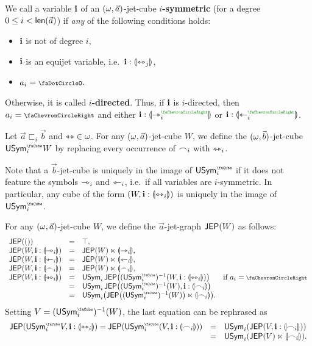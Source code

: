 \documentclass[a4paper]{memoir}
\begin{document}
\begin{definition} \label{def:symmetric-var}
	We call a variable $\mathbf{i}$ of an $(\omega, \vec a)$-jet-cube \textbf{$i$-symmetric} (for a degree $0 \leq i < \mathsf{len}(\vec a)$) if \emph{any} of the following conditions holds:
	\begin{itemize}
		\item $\mathbf{i}$ is not of degree $i$,
		\item $\mathbf{i}$ is an equijet variable, i.e.\ $\mathbf{i} : {\llparenthesis \leftrightarrowtriangle_j \rrparenthesis}$,
		\item $a_i = \npolar$.
	\end{itemize}
	Otherwise, it is called \textbf{$i$-directed}.
	Thus, if $\mathbf{i}$ is $i$-directed, then $a_i = \ypolar$ and either $\dm i : \rival{\jet_i\pmr{\ypolar}}$ or $\dm i : \rival{\tej_i\pmr{\ypolar}}$.
\end{definition}
\begin{definition} \label{def:sym-forget-cube}
	Let $\vec a \sqsubset_i \vec b$ and ${\leftrightarrowtriangle} \in \omega$. For any $(\omega, \vec a)$-jet-cube $W$, we define the $(\omega, \vec b)$-jet-cube $\Usymcube_i W$ by replacing every occurrence of $\frown_i$ with $\leftrightarrowtriangle_i$.
\end{definition}
Note that a $\vec b$-jet-cube is uniquely in the image of $\Usymcube_i$ if it does not feature the symbols $\rightarrowtriangle_i$ and $\leftarrowtriangle_i$, i.e.\ if all variables are $i$-symmetric.
In particular, any cube of the form $(W, \mathbf{i} : {\llparenthesis \leftrightarrowtriangle_i \rrparenthesis})$ is uniquely in the image of $\Usymcube_i$.
\begin{definition} \label{def:jep}
	For any $(\omega, \vec a)$-jet-cube $W$, we define the $\vec a$-jet-graph $\mathsf{JEP}(W)$ as follows:
	\[ \begin{array}{l c l l}
		\JEP(()) &=& \top, \\
		\JEP(W, \dm i : \rival{\jet_i}) &=& \JEP(W) \multip \rival{\jet_i}, \\
		\JEP(W, \dm i : \rival{\tej_i}) &=& \JEP(W) \multip \rival{\tej_i}, \\
		\JEP(W, \dm i : \rival{\edge_i}) &=& \JEP(W) \multip \rival{\edge_i}, \\
		\JEP(W, \dm i : \rival{\equijet_i}) &=& \Usym_i \, \JEP\paren{(\Usymcube_i)\inv(W, \dm i : \rival{\equijet_i})}
		& \text{if $a_i = \ypolar$} \\
		&=& \Usym_i \, \JEP\paren{(\Usymcube_i)\inv(W), \dm i : \rival{\edge_i}} \\
		&=& \Usym_i\paren{\JEP\paren{(\Usymcube_i)\inv(W)} \multip \rival{\edge_i}}.
	\end{array} \]
	Setting $V = (\Usymcube_i)\inv(W)$, the last equation can be rephrased as
	\[ \begin{array}{l c l l}
		\JEP(\Usymcube_i V, \dm i : \rival{\equijet_i})
		= \JEP(\Usymcube_i(V, \dm i : \rival{\edge_i}))
		&=& \Usym_i(\JEP(V, \dm i : \rival{\edge_i})) \\
		&=& \Usym_i(\JEP(V) \multip \rival{\edge_i}).
	\end{array} \]
\end{definition}
\end{document}
